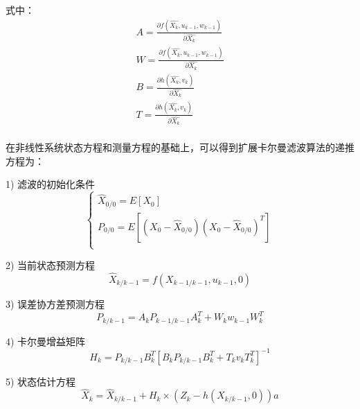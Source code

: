 式中：
\begin{equation}
\begin{array}{l}
   A=\frac{\partial f\left( \widehat{{{X}_{k}}},{{u}_{k-1}},{{w}_{k-1}} \right)}{\partial \widehat{{{X}_{k}}}} \\ 
 W=\frac{\partial f\left( \widehat{{{X}_{k}}},{{u}_{k-1}},{{w}_{k-1}} \right)}{\partial \widehat{{{X}_{k}}}} \\ 
  B=\frac{\partial h\left( \widehat{{{X}_{k}}},{{v}_{k}} \right)}{\partial \widehat{{{X}_{k}}}} \\ 
  T=\frac{\partial h\left( \widehat{{{X}_{k}}},{{v}_{k}} \right)}{\partial \widehat{{{X}_{k}}}} \\ 
\end{array}
\end{equation}

在非线性系统状态方程和测量方程的基础上，可以得到扩展卡尔曼滤波算法的递推方程为：

1) 滤波的初始化条件
\begin{equation}
\left\{ \begin{array}{l}
   {{\widehat{X}}_{0/0}}=E\left[ {{X}_{0}} \right] \\ 
  {{P}_{0/0}}=E\left[ \left( {{X}_{0}}-{{\widehat{X}}_{0/0}} \right){{\left( {{X}_{0}}-{{\widehat{X}}_{0/0}} \right)}^{T}} \right] \\ 
\end{array} \right.
\end{equation}

2) 当前状态预测方程
\begin{equation}
{{\widehat{X}}_{k/k-1}}=f\left( {{X}_{k-1/k-1}},{{u}_{k-1}},0 \right)
\end{equation}

3) 误差协方差预测方程
\begin{equation}
{{P}_{k/k-1}}={{A}_{k}}{{P}_{k-1/k-1}}A_{k}^{T}+{{W}_{k}}{{w}_{k-1}}W_{k}^{T}
\end{equation}  

4) 卡尔曼增益矩阵
\begin{equation}
{{H}_{k}}={{P}_{k/k-1}}B_{k}^{T}{{[{{B}_{k}}{{P}_{k/k-1}}B_{k}^{T}+{{T}_{k}}{{v}_{k}}T_{k}^{T}]}^{-1}}
\end{equation}  
	  
5) 状态估计方程
\begin{equation}
{{\widehat{X}}_{k}}={{\widehat{X}}_{k/k-1}}+{{H}_{k}}\times \left( {{Z}_{k}}-h\left( {{X}_{k/k-1}},0 \right) \right)a
\end{equation}  
	  
